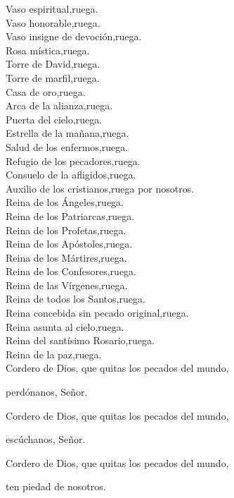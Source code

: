 Vaso espiritual,\hfill ruega.\\
Vaso honorable,\hfill ruega.\\
Vaso insigne de devoción,\hfill ruega.\\
Rosa mística,\hfill ruega.\\
Torre de David,\hfill ruega.\\
Torre de marfil,\hfill ruega.\\
Casa de oro,\hfill ruega.\\
Arca de la alianza,\hfill ruega.\\
Puerta del cielo,\hfill ruega.\\
Estrella de la mañana,\hfill ruega.\\
Salud de los enfermos,\hfill ruega.\\
Refugio de los pecadores,\hfill ruega.\\
Consuelo de la afligidos,\hfill ruega.\\
Auxilio de los cristianos,\hfill ruega por nosotros.\\
Reina de los Ángeles,\hfill ruega.\\
Reina de los Patriarcas,\hfill ruega.\\
Reina de los Profetas,\hfill ruega.\\
Reina de los Apóstoles,\hfill ruega.\\
Reina de los Mártires,\hfill ruega.\\
Reina de los Confesores,\hfill ruega.\\
Reina de las Vírgenes,\hfill ruega.\\
Reina de todos los Santos,\hfill ruega.\\
Reina concebida sin pecado original,\hfill ruega.\\
Reina asunta al cielo,\hfill ruega.\\
Reina del santísimo Rosario,\hfill ruega.\\
Reina de la paz,\hfill ruega.\\
Cordero de Dios, que quitas los pecados del mundo,

\hfill perdónanos, Señor.

Cordero de Dios, que quitas los pecados del mundo,

\hfill escúchanos, Señor.

Cordero de Dios, que quitas los pecados del mundo,

\hfill ten piedad de nosotros.
